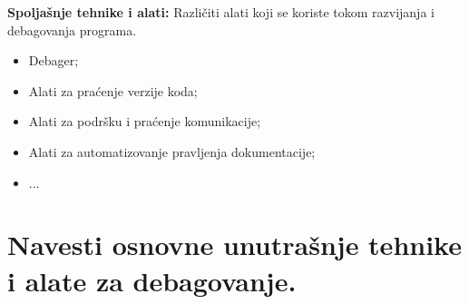 \documentclass[a4paper]{article}
\begin{document}
  \indent \textbf{Spoljašnje tehnike i alati:} Različiti alati koji se koriste tokom razvijanja
  i debagovanja programa.
  \begin{itemize}
    \item Debager;
    \item Alati za praćenje verzije koda;
    \item Alati za podršku i praćenje komunikacije;
    \item Alati za automatizovanje pravljenja dokumentacije;
    \item ...
  \end{itemize}

\section{Navesti osnovne unutrašnje tehnike i alate za debagovanje.}
\end{document}
